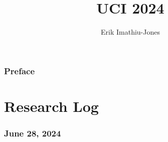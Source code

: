 \documentclass[11pt]{article}
\title{UCI 2024}
\author{Erik Imathiu-Jones}
\begin{document}

\newpage
\section{Preface}

\tableofcontents
\newpage
\part{Research Log}
\section{June 28, 2024}

\end{document}
